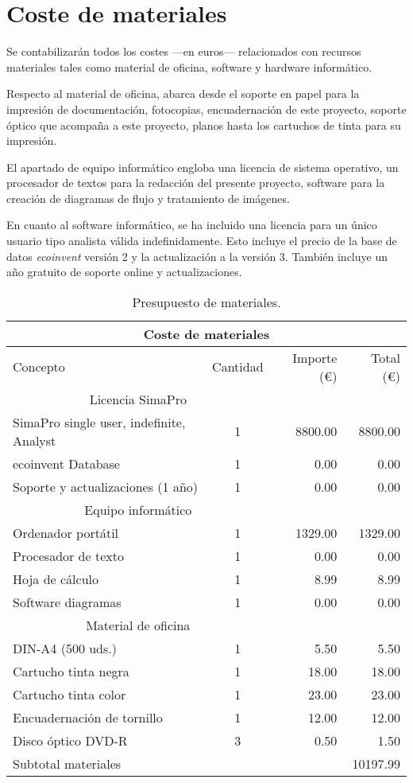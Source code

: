 \chapter{Coste de materiales}
Se contabilizarán todos los costes —en euros— relacionados con recursos materiales tales como material de oficina, software y hardware informático.

Respecto al material de oficina, abarca desde el soporte en papel para la impresión de documentación, fotocopias, encuadernación de este proyecto, soporte óptico que acompaña a este proyecto, planos hasta los cartuchos de tinta para su impresión.

El apartado de equipo informático engloba una licencia de sistema operativo, un procesador de textos para la redacción del presente proyecto, software para la creación de diagramas de flujo y tratamiento de imágenes.

En cuanto al software informático, se ha incluido una licencia para un único usuario tipo analista válida indefinidamente. Esto incluye el precio de la base de datos \textit{ecoinvent} versión 2 y la actualización a la versión 3. También incluye un año gratuito de soporte online y actualizaciones.

\begin{table}[!htb]
\centering
\begin{tabular}{lcrr}
\toprule
\multicolumn{4}{c}{Coste de materiales}\\
\midrule
Concepto & Cantidad & Importe (\euro) & Total (\euro)\\
\midrule
\multicolumn{2}{c}{Licencia SimaPro}\\
\cmidrule(r){1-2}
SimaPro single user, indefinite, Analyst & 1 & 8800.00 & 8800.00\\
ecoinvent Database & 1 & 0.00 & 0.00\\
Soporte y actualizaciones (1 año) & 1 & 0.00 & 0.00\\
\multicolumn{2}{c}{Equipo informático}\\
\cmidrule(r){1-2}
Ordenador portátil & 1 & 1329.00 & 1329.00\\
Procesador de texto & 1 & 0.00 & 0.00\\
Hoja de cálculo & 1 & 8.99 & 8.99\\
Software diagramas & 1 & 0.00 & 0.00\\
\multicolumn{2}{c}{Material de oficina}\\
\cmidrule(r){1-2}
DIN-A4 (500 uds.) & 1 & 5.50 & 5.50\\
Cartucho tinta negra & 1 & 18.00 & 18.00\\
Cartucho tinta color & 1 & 23.00 & 23.00\\
Encuadernación de tornillo & 1 & 12.00 & 12.00\\
Disco óptico DVD-R & 3 & 0.50 & 1.50\\
\bottomrule
Subtotal materiales & & & 10197.99\\
\bottomrule
\end{tabular}
\caption{Presupuesto de materiales.}
\label{presupuestomateriales}
\end{table}

